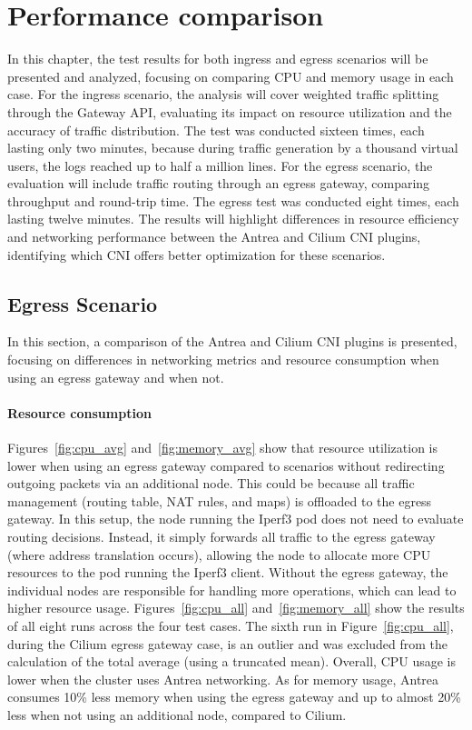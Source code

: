 \chapter{Performance comparison}
\label{cha:performCompare}

In this chapter, the test results for both ingress and egress scenarios will be presented and analyzed, focusing on comparing CPU and memory usage in each case. For the ingress scenario, the analysis will cover weighted traffic splitting through the Gateway API, evaluating its impact on resource utilization and the accuracy of traffic distribution. The test was conducted sixteen times, each lasting only two minutes, because during traffic generation by a thousand virtual users, the logs reached up to half a million lines. For the egress scenario, the evaluation will include traffic routing through an egress gateway, comparing throughput and round-trip time. The egress test was conducted eight times, each lasting twelve minutes. The results will highlight differences in resource efficiency and networking performance between the Antrea and Cilium CNI plugins, identifying which CNI offers better optimization for these scenarios.


\section{Egress Scenario}
\label{sec:egressComparison}

In this section, a comparison of the Antrea and Cilium CNI plugins is presented, focusing on differences in networking metrics and resource consumption when using an egress gateway and when not.

\subsubsection{Resource consumption}
\label{sec:egressResoureComsumption}



Figures~\ref{fig:cpu_avg} and~\ref{fig:memory_avg} show that resource utilization is lower when using an egress gateway compared to scenarios without redirecting outgoing packets via an additional node. This could be because all traffic management (routing table, NAT rules, and maps) is offloaded to the egress gateway. In this setup, the node running the Iperf3 pod does not need to evaluate routing decisions. Instead, it simply forwards all traffic to the egress gateway (where address translation occurs), allowing the node to allocate more CPU resources to the pod running the Iperf3 client. Without the egress gateway, the individual nodes are responsible for handling more operations, which can lead to higher resource usage. Figures~\ref{fig:cpu_all} and~\ref{fig:memory_all} show the results of all eight runs across the four test cases. The sixth run in Figure~\ref{fig:cpu_all}, during the Cilium egress gateway case, is an outlier and was excluded from the calculation of the total average (using a truncated mean). Overall, CPU usage is lower when the cluster uses Antrea networking. As for memory usage, Antrea consumes 10\% less memory when using the egress gateway and up to almost 20\% less when not using an additional node, compared to Cilium. 

